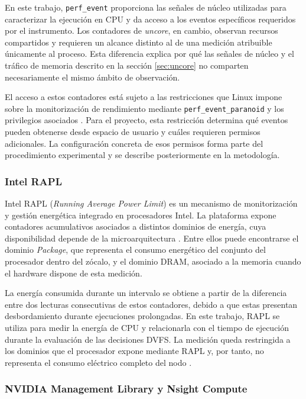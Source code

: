 En este trabajo, \texttt{perf\_event} proporciona las señales de núcleo
utilizadas para caracterizar la ejecución en CPU y da acceso a los eventos
específicos requeridos por el instrumento. Los contadores de
\textit{uncore}, en cambio, observan recursos compartidos y requieren un
alcance distinto al de una medición atribuible únicamente al proceso. Esta
diferencia explica por qué las señales de núcleo y el tráfico de memoria
descrito en la sección \ref{sec:uncore} no comparten necesariamente el mismo
ámbito de observación.

El acceso a estos contadores está sujeto a las restricciones que Linux impone
sobre la monitorización de rendimiento mediante
\texttt{perf\_event\_paranoid} y los privilegios asociados
\cite{LinuxPerfEventOpen2026}. Para el proyecto, esta restricción determina
qué eventos pueden obtenerse desde espacio de usuario y cuáles requieren
permisos adicionales. La configuración concreta de esos permisos forma parte
del procedimiento experimental y se describe posteriormente en la metodología.

\subsubsection{Intel RAPL}
\label{sec:rapl}

Intel RAPL (\textit{Running Average Power Limit}) es un mecanismo de
monitorización y gestión energética integrado en procesadores Intel. La
plataforma expone contadores acumulativos asociados a distintos dominios de
energía, cuya disponibilidad depende de la microarquitectura
\cite{David2010,Thamm2025}. Entre ellos puede encontrarse el dominio
\textit{Package}, que representa el consumo energético del conjunto del
procesador dentro del zócalo, y el dominio DRAM, asociado a la memoria cuando
el hardware dispone de esta medición.

La energía consumida durante un intervalo se obtiene a partir de la diferencia
entre dos lecturas consecutivas de estos contadores, debido a que estas presentan desbordamiento durante ejecuciones prolongadas. En este trabajo, RAPL se
utiliza para medir la energía de CPU y relacionarla con el tiempo de ejecución
durante la evaluación de las decisiones DVFS. La medición queda restringida a
los dominios que el procesador expone mediante RAPL y, por tanto, no representa
el consumo eléctrico completo del nodo \cite{Thamm2025}.

\subsubsection{NVIDIA Management Library y Nsight Compute}
\label{sec:marco-nvml-ncu}

